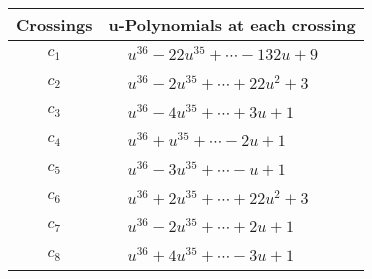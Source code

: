 \documentclass[1p]{elsarticle_modified}
\theoremstyle{definition}
\begin{document}
\begin{tabular}{m{50pt}|m{274pt}}
Crossings & \hspace{64pt}u-Polynomials at each crossing \\
\hline $$\begin{aligned}c_{1}\end{aligned}$$&$\begin{aligned}
&u^{36}-22 u^{35}+\cdots-132 u+9
\end{aligned}$\\
\hline $$\begin{aligned}c_{2}\end{aligned}$$&$\begin{aligned}
&u^{36}-2 u^{35}+\cdots+22 u^2+3
\end{aligned}$\\
\hline $$\begin{aligned}c_{3}\end{aligned}$$&$\begin{aligned}
&u^{36}-4 u^{35}+\cdots+3 u+1
\end{aligned}$\\
\hline $$\begin{aligned}c_{4}\end{aligned}$$&$\begin{aligned}
&u^{36}+u^{35}+\cdots-2 u+1
\end{aligned}$\\
\hline $$\begin{aligned}c_{5}\end{aligned}$$&$\begin{aligned}
&u^{36}-3 u^{35}+\cdots- u+1
\end{aligned}$\\
\hline $$\begin{aligned}c_{6}\end{aligned}$$&$\begin{aligned}
&u^{36}+2 u^{35}+\cdots+22 u^2+3
\end{aligned}$\\
\hline $$\begin{aligned}c_{7}\end{aligned}$$&$\begin{aligned}
&u^{36}-2 u^{35}+\cdots+2 u+1
\end{aligned}$\\
\hline $$\begin{aligned}c_{8}\end{aligned}$$&$\begin{aligned}
&u^{36}+4 u^{35}+\cdots-3 u+1
\end{aligned}$\\

\end{tabular}
\end{document}
